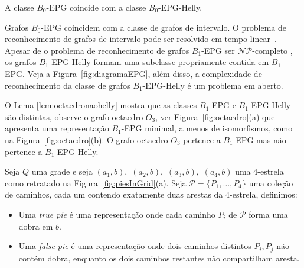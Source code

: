 \begin{corollary}
A classe $B_0$-EPG coincide com a classe $B_0$-EPG-Helly.
\end{corollary}

Grafos $B_0$-EPG coincidem com a classe de grafos de intervalo. O problema de reconhecimento de grafos de intervalo pode ser resolvido em tempo linear~\cite{booth1976}. Apesar de o problema de reconhecimento de grafos $ B_1$-EPG ser $\mathcal{NP}$-completo \cite {heldt2014}, os grafos $ B_1$-EPG-Helly formam uma subclasse propriamente contida em $ B_1$-EPG. Veja a Figura~\ref{fig:diagramaEPG},  além disso, a complexidade de reconhecimento da classe de grafos $ B_1$-EPG-Helly é um problema em aberto. 

O Lema \ref{lem:octaedronaohelly} mostra que as classes  $ B_1$-EPG e $ B_1$-EPG-Helly são distintas, observe o grafo octaedro $ O_3$, ver Figura~\ref{fig:octaedro}(a) que apresenta uma representação  $B_1$-EPG minimal, a menos de isomorfismos, como na Figura~\ref{fig:octaedro}(b). O grafo octaedro  $ O_3 $ pertence a $ B_1$-EPG mas não pertence a $B_1$-EPG-Helly.






\begin{definition} \label{defi:tortasFrame}

Seja $ Q $ uma grade e seja $ (a_1, b),$ $(a_2, b),$ $(a_3, b),$ $(a_4, b)$ uma 4-estrela como retratado na Figura~\ref{fig:piesInGrid}(a). Seja  $ \mathcal{P} = \{P_1, \dots , P_4\}$ uma coleção de caminhos, cada um contendo exatamente duas arestas da $4$-estrela, definimos:

\begin{itemize}
\item Uma \emph{true pie} é uma representação onde cada caminho $P_i$ de $ \mathcal{P} $ forma uma dobra em $b$.

\item Uma \emph {false pie} é uma representação onde dois caminhos distintos $P_i, P_j$  não contém dobra, enquanto os dois caminhos restantes não compartilham aresta. 




\end{itemize}
\end{definition}

